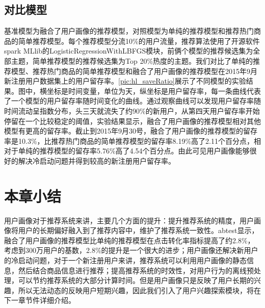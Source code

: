       \subsection{对比模型}
      基准模型为融合了用户画像的推荐模型，对照模型为单纯的推荐模型和推荐热门商品的简单推荐模型。每个推荐模型分流10\%的用户流量，推荐算法使用了开源软件spark MLlib的LogisticRegressionWithLBFGS模块，前俩个模型的推荐候选集为全部主题，简单推荐模型的推荐候选集为Top 20\%热度的主题。我们对比了单纯的推荐模型、推荐热门商品的简单推荐模型和融合了用户画像的推荐模型在2015年9月新注册用户数据集上的用户留存率。\autoref{pic:hl_saveRatio}展示了不同模型的实验结果。图中，横坐标是时间变量，单位为天，纵坐标是用户留存率，每一条曲线代表了一个模型的用户留存率随时间变化的曲线。通过观察曲线可以发现用户留存率随时间流动呈指数分布，头三天就流失了约90\%的新用户，从第四天用户留存率开始停留在一个比较稳定的阈值，实验结果显示，融合了用户画像的推荐模型相对其他模型有更高的留存率。截止到2015年9月30号，融合了用户画像的推荐模型的留存率是10.3\%，比推荐热门商品的简单推荐模型的留存率8.19\%高了2.11个百分点，相对于单纯的推荐模型的留存率5.76\%高了4.54个百分点。由此可见用户画像能够很好的解决冷启动问题并得到较高的新注册用户留存率。
      \begin{figure}
      \centering
        \label{pic:hl_saveRatio}
      \end{figure}

    \section{本章小结}
      用户画像对于推荐系统来讲，主要几个方面的提升：提升推荐系统的精度，用户画像将用户的长期偏好融入到了推荐内容中，维护了推荐系统一致性。abtest显示，融合了用户画像的推荐模型比单纯的推荐模型在点击转化率指标提高了约2.8\%，考虑到300万用户的基数，2.8\%的提升是一个很大的进步；用户画像还解决新用户的冷启动问题，对于一个新注册用户来讲，推荐系统可以利用用户画像的静态信息，然后结合商品信息进行推荐；提高推荐系统的时效性，对用户行为的离线预处理，可以节约推荐系统的大部分计算时间。但是用户画像只是反映了用户长期的兴趣，所以无法动态的反映用户短期兴趣，因此我们引入了用户兴趣探索模块，将在下一章节件详细介绍。
